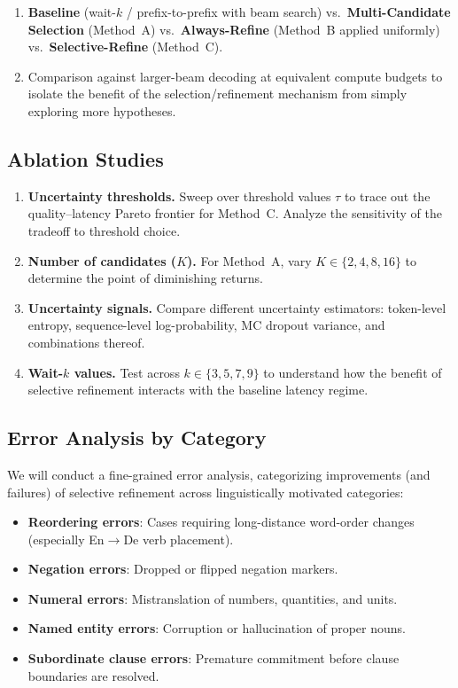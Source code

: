 \begin{enumerate}[leftmargin=*, itemsep=4pt]
    \item \textbf{Baseline} (wait-$k$ / prefix-to-prefix with beam search) vs.\ \textbf{Multi-Candidate Selection} (Method~A) vs.\ \textbf{Always-Refine} (Method~B applied uniformly) vs.\ \textbf{Selective-Refine} (Method~C).
    \item Comparison against larger-beam decoding at equivalent compute budgets to isolate the benefit of the selection/refinement mechanism from simply exploring more hypotheses.
\end{enumerate}

\subsection{Ablation Studies}

\begin{enumerate}[leftmargin=*, itemsep=4pt]
    \item \textbf{Uncertainty thresholds.} Sweep over threshold values $\tau$ to trace out the quality--latency Pareto frontier for Method~C. Analyze the sensitivity of the tradeoff to threshold choice.

    \item \textbf{Number of candidates ($K$).} For Method~A, vary $K \in \{2, 4, 8, 16\}$ to determine the point of diminishing returns.

    \item \textbf{Uncertainty signals.} Compare different uncertainty estimators: token-level entropy, sequence-level log-probability, MC dropout variance, and combinations thereof.

    \item \textbf{Wait-$k$ values.} Test across $k \in \{3, 5, 7, 9\}$ to understand how the benefit of selective refinement interacts with the baseline latency regime.
\end{enumerate}

\subsection{Error Analysis by Category}

We will conduct a fine-grained error analysis, categorizing improvements (and failures) of selective refinement across linguistically motivated categories:

\begin{itemize}[leftmargin=*, itemsep=2pt]
    \item \textbf{Reordering errors}: Cases requiring long-distance word-order changes (especially En$\rightarrow$De verb placement).
    \item \textbf{Negation errors}: Dropped or flipped negation markers.
    \item \textbf{Numeral errors}: Mistranslation of numbers, quantities, and units.
    \item \textbf{Named entity errors}: Corruption or hallucination of proper nouns.
    \item \textbf{Subordinate clause errors}: Premature commitment before clause boundaries are resolved.
\end{itemize}

